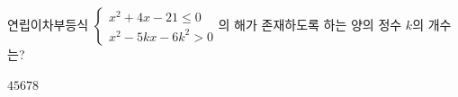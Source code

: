 \hspace*{2mm}\begin{minipage}[t]{\dimexpr\linewidth-2mm\relax}\vspace{0pt}
연립이차부등식 $\begin{cases} x^2+4x-21\le 0 \\ x^2-5kx-6k^2>0 \end{cases}$의 해가 존재하도록 하는 양의 정수 $k$의 개수는?
\begin{choices32}{$4$}{$5$}{$6$}{$7$}{$8$}\end{choices32}\end{minipage}
